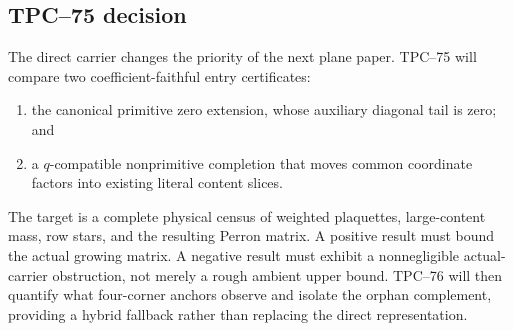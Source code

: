 \subsection{TPC--75 decision}

The direct carrier changes the priority of the next plane paper.  TPC--75
will compare two coefficient-faithful entry certificates:
\begin{enumerate}[label=\textup{(\roman*)},leftmargin=3em]
 \item the canonical primitive zero extension, whose auxiliary diagonal
       tail is zero; and
 \item a \(q\)-compatible nonprimitive completion that moves common
       coordinate factors into existing literal content slices.
\end{enumerate}
The target is a complete physical census of weighted plaquettes,
large-content mass, row stars, and the resulting Perron matrix.  A positive
result must bound the actual growing matrix.  A negative result must
exhibit a nonnegligible actual-carrier obstruction, not merely a rough
ambient upper bound.  TPC--76 will then quantify what four-corner anchors
observe and isolate the orphan complement, providing a hybrid fallback
rather than replacing the direct representation.
